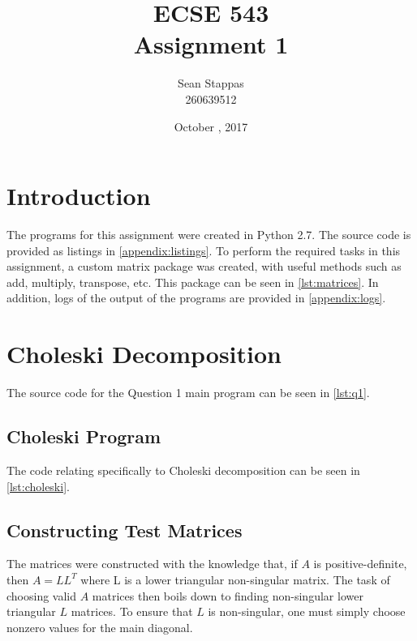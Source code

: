 \documentclass[a4paper,titlepage]{article}
\title{\textbf{ECSE 543 \\ Assignment 1}}
\author{Sean Stappas \\ 260639512}
\date{October \nth{17}, 2017}
\begin{document}
	\sloppy
	\maketitle
	\twocolumn
	
	\section{Introduction}
	
	The programs for this assignment were created in Python 2.7. The source code is provided as listings in \autoref{appendix:listings}. To perform the required tasks in this assignment, a custom matrix package was created, with useful methods such as add, multiply, transpose, etc. This package can be seen in \autoref{lst:matrices}. In addition, logs of the output of the programs are provided in \autoref{appendix:logs}.
	
	\section{Choleski Decomposition}
	
	The source code for the Question 1 main program can be seen in \autoref{lst:q1}.
	
	\subsection{Choleski Program}
	
	The code relating specifically to Choleski decomposition can be seen in \autoref{lst:choleski}.
	
	
	\subsection{Constructing Test Matrices}
	
	The matrices were constructed with the knowledge that, if $A$ is positive-definite, then $A = LL^T$ where L is a lower triangular non-singular matrix. The task of choosing valid $A$ matrices then boils down to finding non-singular lower triangular $L$ matrices. To ensure that $L$ is non-singular, one must simply choose nonzero values for the main diagonal.
	
\end{document}
